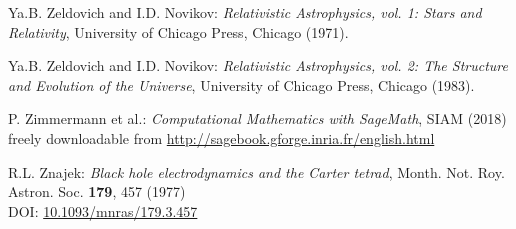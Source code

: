 \begin{thebibliography}{123}
Ya.B. Zeldovich and I.D. Novikov:
{\em Relativistic Astrophysics, vol. 1: Stars and Relativity},
University of Chicago Press, Chicago (1971).

Ya.B. Zeldovich and I.D. Novikov:
{\em Relativistic Astrophysics, vol. 2: The Structure and Evolution of the Universe},
University of Chicago Press, Chicago (1983).

P. Zimmermann et al.: {\em Computational Mathematics with SageMath}, SIAM (2018) \\
freely downloadable from \url{http://sagebook.gforge.inria.fr/english.html}

R.L. Znajek:
{\em Black hole electrodynamics and the Carter tetrad},
Month. Not. Roy. Astron. Soc. {\bf 179}, 457 (1977)\\
DOI: \href{https://doi.org/10.1093/mnras/179.3.457}{10.1093/mnras/179.3.457}

\end{thebibliography}

